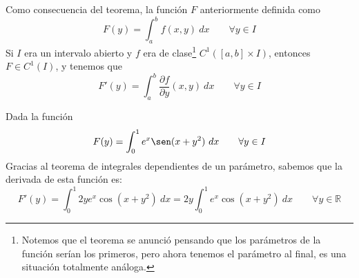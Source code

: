 \noindent
Como consecuencia del teorema, la función $F$ anteriormente definida como
\begin{equation*}
    F(y) = \int_{a}^{b} f(x,y)~dx \qquad \forall y\in I
\end{equation*}
Si $I$ era un intervalo abierto y $f$ era de clase\footnote{Notemos que el teorema se anunció pensando que los parámetros de la función serían los primeros, pero ahora tenemos el parámetro al final, es una situación totalmente análoga.} $C^1([a,b]\times I)$, entonces $F\in C^1(I)$, y tenemos que 
\begin{equation*}
    F'(y) = \int_{a}^{b} \dfrac{\partial f}{\partial y}(x,y)~dx  \qquad \forall y\in I
\end{equation*}

\begin{ejemplo}
    Dada la función
    \begin{equation*}
        F(y) = \int_{0}^{1} e^x \sen(x+y^2)~dx \qquad \forall y\in I
    \end{equation*}
    Gracias al teorema de integrales dependientes de un parámetro, sabemos que la derivada de esta función es:
    \begin{equation*}
        F'(y) = \int_{0}^{1} 2ye^x \cos(x+y^2)~dx = 2y\int_{0}^{1} e^x \cos(x+y^2)~dx \qquad \forall y\in \mathbb{R}
    \end{equation*}
\end{ejemplo}

